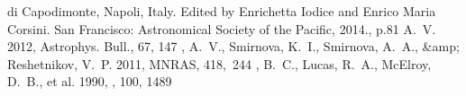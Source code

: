 {{{{{{{{{{{{{{\begin{references}
 di Capodimonte, Napoli, Italy. Edited by Enrichetta Iodice and Enrico Maria Corsini.  San Francisco: Astronomical Society of the Pacific, 2014., p.81
  A.~V. 2012, Astrophys. Bull., 67, 147
, A.~V., {Smirnova},
  K.~I., {Smirnova}, A.~A., \&amp; {Reshetnikov}, V.~P.  2011, MNRAS,
  418,~244
, B.~C., {Lucas}, R.~A., {McElroy}, D.~B., et al. 1990,
  \aj, 100, 1489



\end{references}}}}}}}}}}}}}}}
